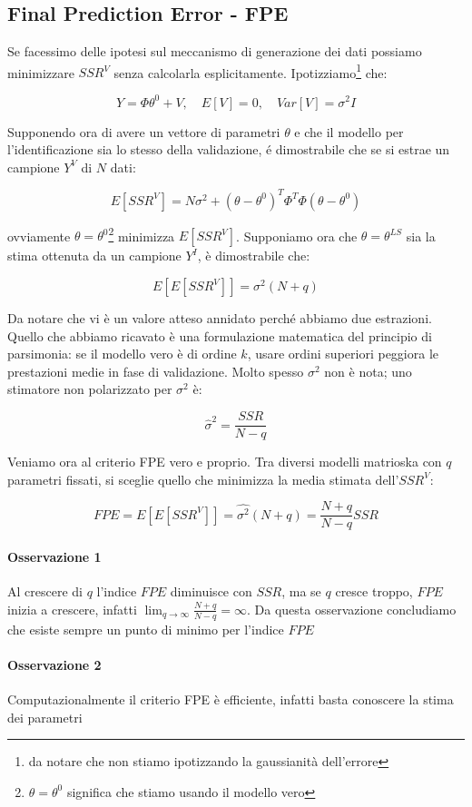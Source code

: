 \subsection{Final Prediction Error - FPE}
Se facessimo delle ipotesi sul meccanismo di generazione dei dati possiamo minimizzare $SSR^V$ senza calcolarla esplicitamente. Ipotizziamo\footnote{da notare che non stiamo ipotizzando la gaussianità dell'errore} che:

    \[ Y=\Phi\theta^0+V,\quad E[V]=0,\quad  Var[V]=\sigma^2 I \]

Supponendo ora di avere un vettore di parametri $\theta$ e che il modello per l'identificazione sia lo stesso della validazione, é dimostrabile che se si estrae un campione $Y^V$ di $N$ dati:

    \[ E[SSR^V]=N \sigma^2+(\theta-\theta^0)^T\Phi^T\Phi(\theta-\theta^0) \]

ovviamente $\theta=\theta^0$\footnote{$\theta=\theta^0$ significa che stiamo usando il modello vero} minimizza $E[SSR^V]$. Supponiamo ora che $\theta=\theta^{LS}$ sia la stima ottenuta da un campione $Y^I$, è dimostrabile che:

    \[ E[E[SSR^V]]=\sigma^2(N+q) \]

Da notare che vi è un valore atteso annidato perché abbiamo due estrazioni. Quello che abbiamo ricavato è una formulazione matematica del principio di parsimonia: se il modello vero è di ordine $k$, usare ordini superiori peggiora le prestazioni medie in fase di validazione. Molto spesso $\sigma^2$ non è nota; uno stimatore non polarizzato per $\sigma^2$ è:

    \[ \hat{\sigma}^2=\frac{SSR}{N-q} \]

Veniamo ora al criterio FPE vero e proprio. Tra diversi modelli matrioska con $q$ parametri fissati, si sceglie quello che minimizza la media stimata dell'$SSR^V$:

    \[ FPE=E[E[SSR^V]]=\hat{\sigma^2}(N+q)=\frac{N+q}{N-q}SSR \]

\paragraph{Osservazione 1} Al crescere di $q$ l'indice $FPE$ diminuisce con $SSR$, ma se $q$ cresce troppo, $FPE$ inizia a crescere, infatti $\lim_{q\rightarrow\infty}{\frac{N+q}{N-q}}=\infty$. Da questa osservazione concludiamo che esiste sempre un punto di minimo per l'indice $FPE$
\paragraph{Osservazione 2} Computazionalmente il criterio FPE è efficiente, infatti basta conoscere la stima dei parametri
